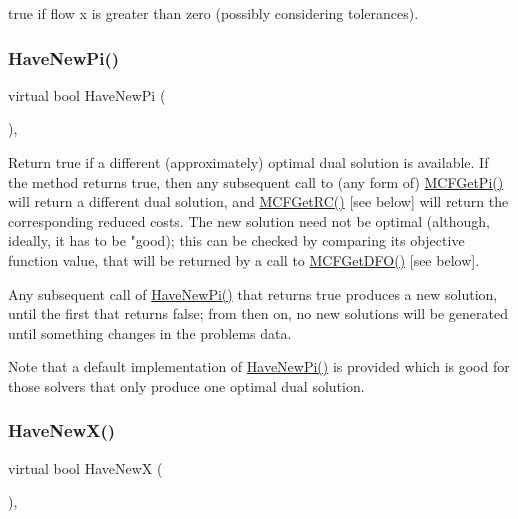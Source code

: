 true if flow x is greater than zero (possibly considering tolerances). \mbox{\label{class_m_c_f_class_a87b2b6516a7874ac55145312bd2d55bb}} 
\subsubsection{\texorpdfstring{Have\+New\+Pi()}{HaveNewPi()}}
{\footnotesize\ttfamily virtual bool Have\+New\+Pi (\begin{DoxyParamCaption}\item[{void}]{ }\end{DoxyParamCaption})\hspace{0.3cm}{\ttfamily [inline]}, {\ttfamily [virtual]}}

Return true if a different (approximately) optimal dual solution is available. If the method returns true, then any subsequent call to (any form of) \mbox{\hyperlink{class_m_c_f_class_a8f1a95d5c707f83ffc6aecba1e7e0e10}{M\+C\+F\+Get\+Pi()}} will return a different dual solution, and \mbox{\hyperlink{class_m_c_f_class_af027cee8179a876a4879c73820c380d1}{M\+C\+F\+Get\+R\+C()}} \mbox{[}see below\mbox{]} will return the corresponding reduced costs. The new solution need not be optimal (although, ideally, it has to be "good); this can be checked by comparing its objective function value, that will be returned by a call to \mbox{\hyperlink{class_m_c_f_class_aca66f278ea62640af8e54590c687d715}{M\+C\+F\+Get\+D\+F\+O()}} \mbox{[}see below\mbox{]}.

Any subsequent call of \mbox{\hyperlink{class_m_c_f_class_a87b2b6516a7874ac55145312bd2d55bb}{Have\+New\+Pi()}} that returns true produces a new solution, until the first that returns false; from then on, no new solutions will be generated until something changes in the problem\textquotesingle{}s data.

Note that a default implementation of \mbox{\hyperlink{class_m_c_f_class_a87b2b6516a7874ac55145312bd2d55bb}{Have\+New\+Pi()}} is provided which is good for those solvers that only produce one optimal dual solution. \mbox{\label{class_m_c_f_class_a7a4966a98c7ffa909057064beb4507a5}} 
\subsubsection{\texorpdfstring{Have\+New\+X()}{HaveNewX()}}
{\footnotesize\ttfamily virtual bool Have\+NewX (\begin{DoxyParamCaption}\item[{void}]{ }\end{DoxyParamCaption})\hspace{0.3cm}{\ttfamily [inline]}, {\ttfamily [virtual]}}

